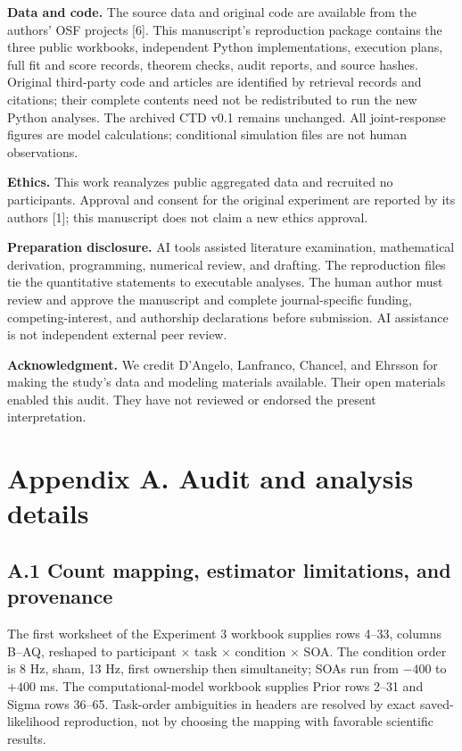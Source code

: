 \documentclass[
  11pt,
]{article}
\let\ctdoldsection\section
\renewcommand{\section}{\Needspace{8\baselineskip}\ctdoldsection}
\let\ctdoldsubsection\subsection
\renewcommand{\subsection}{\Needspace{6\baselineskip}\ctdoldsubsection}
\begin{document}
\textbf{Data and code.} The source data and original code are available
from the authors' OSF projects {[}6{]}. This manuscript's reproduction
package contains the three public workbooks, independent Python
implementations, execution plans, full fit and score records, theorem
checks, audit reports, and source hashes. Original third-party code and
articles are identified by retrieval records and citations; their
complete contents need not be redistributed to run the new Python
analyses. The archived CTD v0.1 remains unchanged. All joint-response
figures are model calculations; conditional simulation files are not
human observations.

\textbf{Ethics.} This work reanalyzes public aggregated data and
recruited no participants. Approval and consent for the original
experiment are reported by its authors {[}1{]}; this manuscript does not
claim a new ethics approval.

\textbf{Preparation disclosure.} AI tools assisted literature
examination, mathematical derivation, programming, numerical review, and
drafting. The reproduction files tie the quantitative statements to
executable analyses. The human author must review and approve the
manuscript and complete journal-specific funding, competing-interest,
and authorship declarations before submission. AI assistance is not
independent external peer review.

\textbf{Acknowledgment.} We credit D'Angelo, Lanfranco, Chancel, and
Ehrsson for making the study's data and modeling materials available.
Their open materials enabled this audit. They have not reviewed or
endorsed the present interpretation.

\newpage

\hypertarget{appendix-a.-audit-and-analysis-details}{%
\section{Appendix A. Audit and analysis
details}\label{appendix-a.-audit-and-analysis-details}}

\hypertarget{a.1-count-mapping-estimator-limitations-and-provenance}{%
\subsection{A.1 Count mapping, estimator limitations, and
provenance}\label{a.1-count-mapping-estimator-limitations-and-provenance}}

The first worksheet of the Experiment 3 workbook supplies rows 4--33,
columns B--AQ, reshaped to participant \(\times\) task \(\times\)
condition \(\times\) SOA. The condition order is 8 Hz, sham, 13 Hz,
first ownership then simultaneity; SOAs run from \(-400\) to \(+400\)
ms. The computational-model workbook supplies Prior rows 2--31 and Sigma
rows 36--65. Task-order ambiguities in headers are resolved by exact
saved-likelihood reproduction, not by choosing the mapping with
favorable scientific results.
\end{document}
